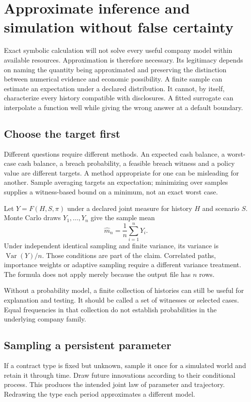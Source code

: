 \chapter[Approximate simulation]{Approximate inference and simulation without false certainty}
\label{sim:approximation}

Exact symbolic calculation will not solve every useful company model within available resources. Approximation is therefore necessary. Its legitimacy depends on naming the quantity being approximated and preserving the distinction between numerical evidence and economic possibility. A finite sample can estimate an expectation under a declared distribution. It cannot, by itself, characterize every history compatible with disclosures. A fitted surrogate can interpolate a function well while giving the wrong answer at a default boundary.

\section{Choose the target first}
Different questions require different methods. An expected cash balance, a worst-case cash balance, a breach probability, a feasible breach witness and a policy value are different targets. A method appropriate for one can be misleading for another. Sample averaging targets an expectation; minimizing over samples supplies a witness-based bound on a minimum, not an exact worst case.

Let $Y=F(H,S,\pi)$ under a declared joint measure for history $H$ and scenario $S$. Monte Carlo draws $Y_1,\ldots,Y_n$ give the sample mean
\begin{equation}
 \widehat m_n=\frac1n\sum_{i=1}^nY_i.
\end{equation}
Under independent identical sampling and finite variance, its variance is $\operatorname{Var}(Y)/n$. Those conditions are part of the claim. Correlated paths, importance weights or adaptive sampling require a different variance treatment. The formula does not apply merely because the output file has $n$ rows.

Without a probability model, a finite collection of histories can still be useful for explanation and testing. It should be called a set of witnesses or selected cases. Equal frequencies in that collection do not establish probabilities in the underlying company family.

\section{Sampling a persistent parameter}
If a contract type is fixed but unknown, sample it once for a simulated world and retain it through time. Draw future innovations according to their conditional process. This produces the intended joint law of parameter and trajectory. Redrawing the type each period approximates a different model.

